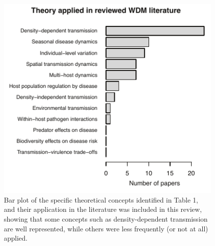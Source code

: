 \begin{figure}
	\caption[Theoretical concepts applied in the wildlife disease literature]{
Bar plot of the specific theoretical concepts identified in Table 1, and their application in the literature was included in this review, showing that some concepts such as density-dependent transmission are well represented, while others were less frequently (or not at all) applied.}
    \begin{center}
	\includegraphics[width=150mm]{figs/ch1/WDMf3.pdf}
    \end{center}
\label{1-3}
\end{figure}

